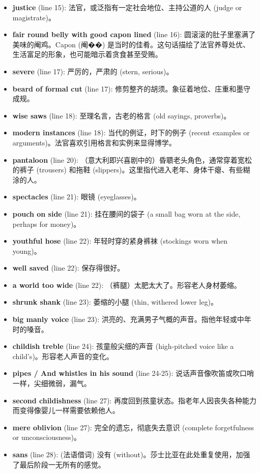 \documentclass[12pt, a4paper]{article}
\begin{document}
\begin{itemize}
    \item \textbf{justice} (line 15): 法官，或泛指有一定社会地位、主持公道的人 (judge or magistrate)。
    \item \textbf{fair round belly with good capon lined} (line 16): 圆滚滚的肚子里塞满了美味的阉鸡。Capon (阉��) 是当时的佳肴。这句话描绘了法官养尊处优、生活富足的形象，也可能暗示着贪食甚至受贿。
    \item \textbf{severe} (line 17): 严厉的，严肃的 (stern, serious)。
    \item \textbf{beard of formal cut} (line 17): 修剪整齐的胡须。象征着地位、庄重和墨守成规。
    \item \textbf{wise saws} (line 18): 至理名言，古老的格言 (old sayings, proverbs)。
    \item \textbf{modern instances} (line 18): 当代的例证，时下的例子 (recent examples or arguments)。法官喜欢引用格言和实例来显得博学。
    \item \textbf{pantaloon} (line 20): （意大利即兴喜剧中的）昏聩老头角色，通常穿着宽松的裤子 (trousers) 和拖鞋 (slippers)。这里指代进入老年、身体干瘪、有些糊涂的人。
    \item \textbf{spectacles} (line 21): 眼镜 (eyeglasses)。
    \item \textbf{pouch on side} (line 21): 挂在腰间的袋子 (a small bag worn at the side, perhaps for money)。
    \item \textbf{youthful hose} (line 22): 年轻时穿的紧身裤袜 (stockings worn when young)。
    \item \textbf{well saved} (line 22): 保存得很好。
    \item \textbf{a world too wide} (line 22): （裤腿）太肥太大了。形容老人身材萎缩。
    \item \textbf{shrunk shank} (line 23): 萎缩的小腿 (thin, withered lower leg)。
    \item \textbf{big manly voice} (line 23): 洪亮的、充满男子气概的声音。指他年轻或中年时的嗓音。
    \item \textbf{childish treble} (line 24): 孩童般尖细的声音 (high-pitched voice like a child's)。形容老人声音的变化。
    \item \textbf{pipes / And whistles in his sound} (line 24-25): 说话声音像吹笛或吹口哨一样，尖细微弱，漏气。
    \item \textbf{second childishness} (line 27): 再度回到孩童状态。指老年人因丧失各种能力而变得像婴儿一样需要依赖他人。
    \item \textbf{mere oblivion} (line 27): 完全的遗忘，彻底失去意识 (complete forgetfulness or unconsciousness)。
    \item \textbf{sans} (line 28): (法语借词) 没有 (without)。莎士比亚在此处重复使用，加强了最后阶段一无所有的感觉。
\end{itemize}
\end{document}
